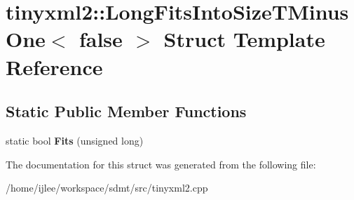 \hypertarget{structtinyxml2_1_1_long_fits_into_size_t_minus_one_3_01false_01_4}{}\section{tinyxml2\+:\+:Long\+Fits\+Into\+Size\+T\+Minus\+One$<$ false $>$ Struct Template Reference}
\label{structtinyxml2_1_1_long_fits_into_size_t_minus_one_3_01false_01_4}
\subsection*{Static Public Member Functions}
\begin{DoxyCompactItemize}
\item 
\mbox{\label{structtinyxml2_1_1_long_fits_into_size_t_minus_one_3_01false_01_4_a29b01087f38a951276df69d358dc0764}} 
static bool {\bfseries Fits} (unsigned long)
\end{DoxyCompactItemize}


The documentation for this struct was generated from the following file\+:\begin{DoxyCompactItemize}
\item 
/home/ijlee/workspace/sdmt/src/tinyxml2.\+cpp\end{DoxyCompactItemize}
